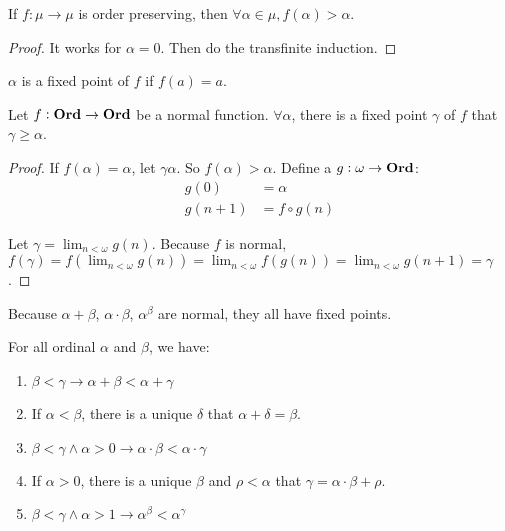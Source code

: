 \begin{theorem}
    If $f: \mu \rightarrow \mu$ is order preserving, then $\forall \alpha \in \mu,  f(\alpha) > \alpha$.
\end{theorem}
\begin{proof}
    It works for $\alpha = 0$. Then do the transfinite induction.
\end{proof}

\begin{definition}
    $\alpha$ is a fixed point of $f$ if $f(a) = a$.
\end{definition}

\begin{theorem}
    Let $f: \mathbf{Ord} \rightarrow \mathbf{Ord}$     be a normal function. $\forall \alpha$, there is a fixed point $\gamma$ of $f$ that $\gamma \geq \alpha$.
\end{theorem}
\begin{proof}
    If $f(\alpha) = \alpha$, let $\gamma \alpha$. So $f(\alpha) > \alpha$. Define a $g: \omega \rightarrow \mathbf{Ord}$:
    \begin{equation}
        \begin{aligned}
            g(0) &= \alpha \\
            g(n+1) &= f \circ g (n)
        \end{aligned}
    \end{equation}
    
    Let $\gamma = \lim_{n < \omega} g(n)$. Because $f$ is normal, $f(\gamma) = f(\lim_{n < \omega} g(n)) = \lim_{n < \omega} f(g(n)) = \lim_{n < \omega} g(n+1) = \gamma$.
\end{proof}

Because $\alpha + \beta$, $\alpha \cdot \beta$, $\alpha^\beta$ are normal, they all have fixed points.

\begin{theorem}
    For all ordinal $\alpha$ and $\beta$, we have:
    \begin{enumerate}
        \item $\beta < \gamma \rightarrow \alpha + \beta < \alpha + \gamma$
        \item If $ \alpha < \beta$, there is a unique $\delta$ that $\alpha + \delta = \beta$.
        \item $\beta < \gamma \wedge \alpha > 0 \rightarrow \alpha \cdot \beta < \alpha \cdot \gamma$
        \item If $\alpha > 0$, there is a unique $\beta$ and $\rho < \alpha$ that $\gamma = \alpha \cdot \beta + \rho$.
        \item $\beta < \gamma \wedge \alpha > 1 \rightarrow \alpha^\beta < \alpha^\gamma$
    \end{enumerate}
\end{theorem}

